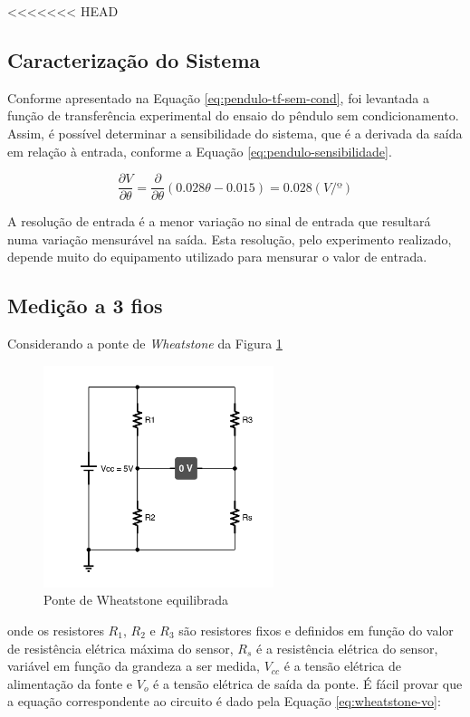 \documentclass[a4paper]{instrumentacao}
\begin{document}
<<<<<<< HEAD
\subsection{Caracterização do Sistema}
Conforme apresentado na Equação \ref{eq:pendulo-tf-sem-cond}, foi levantada a função de transferência experimental do ensaio do pêndulo sem condicionamento. Assim, é possível determinar a sensibilidade do sistema, que é a derivada da saída em relação à entrada, conforme a Equação \ref{eq:pendulo-sensibilidade}.

\begin{equation}
	\frac{\partial V}{\partial \theta}=\frac{\partial}{\partial \theta}(0.028\theta-0.015)=0.028(V/º)
	\label{eq:pendulo-sensibilidade}
\end{equation}

A resolução de entrada é a menor variação no sinal de entrada que resultará numa variação mensurável na saída.  Esta resolução, pelo experimento realizado, depende muito do equipamento utilizado para mensurar o valor de entrada.


\subsection{Medição a 3 fios}

Considerando a ponte de \textit{Wheatstone} da Figura \ref{fig:3fios-wheatstone}

\begin{figure}[H]
\centering
\includegraphics[width=0.6\textwidth]{Wheatstone-Bridge.pdf}
\caption{Ponte de Wheatstone equilibrada}
\label{fig:3fios-wheatstone}
\end{figure}

\noindent onde os resistores $R_1$, $R_2$ e $R_3$ são resistores fixos e definidos em função do valor de resistência elétrica máxima do sensor, $R_s$ é a resistência elétrica do sensor, variável em função da grandeza a ser medida, $V_{cc}$ é a tensão elétrica de alimentação da fonte e $V_o$ é a tensão elétrica de saída da ponte. É fácil provar que a equação correspondente ao circuito é dado pela Equação \ref{eq:wheatstone-vo}:
\end{document}
